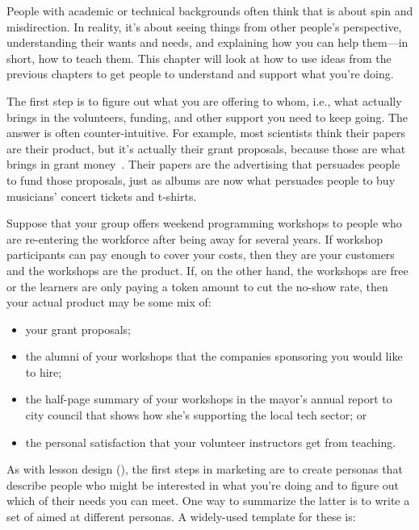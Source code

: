 
People with academic or technical backgrounds often think that
 is about spin and misdirection.
In reality,
it's about seeing things from other people's perspective,
understanding their wants and needs,
and explaining how you can help them---in short,
how to teach them.
This chapter will look at how to use ideas from the previous chapters
to get people to understand and support what you're doing.


The first step is to figure out what you are offering to whom,
i.e.,
what actually brings in the volunteers,
funding,
and other support you need to keep going.
The answer is often counter-intuitive.
For example,
most scientists think their papers are their product,
but it's actually their grant proposals,
because those are what brings in grant money~\cite{Kuch2011}.
Their papers are the advertising that persuades people to fund those proposals,
just as albums are now what persuades people to buy musicians' concert tickets and t-shirts.

Suppose that your group offers weekend programming workshops
to people who are re-entering the workforce after being away for several years.
If workshop participants can pay enough to cover your costs,
then they are your customers and the workshops are the product.
If,
on the other hand,
the workshops are free or the learners are only paying a token amount to cut the no-show rate,
then your actual product may be some mix of:

\begin{itemize}

\item
  your grant proposals;

\item
  the alumni of your workshops
  that the companies sponsoring you would like to hire;

\item
  the half-page summary of your workshops in the mayor's annual report to city council
  that shows how she's supporting the local tech sector;
  or

\item
  the personal satisfaction that your volunteer instructors get from teaching.

\end{itemize}

As with lesson design (),
the first steps in marketing are
to create personas that describe people who might be interested in what you're doing
and to figure out which of their needs you can meet.
One way to summarize the latter is to write a set of 
aimed at different personas.
A widely-used template for these is:


